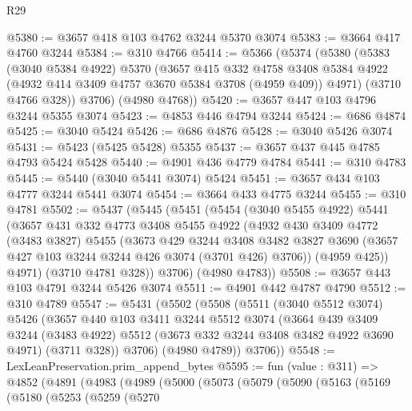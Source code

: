 \begin{lexlean}{R29}
\begin{coremodule}
@5380 := @3657 @418 @103 @4762 @3244 @5370 @3074
@5383 := @3664 @417 @4760 @3244
@5384 := @310 @4766
@5414 := @5366
    (@5374
      (@5380
        (@5383
          (@3040 @5384 @4922)
          @5370
          (@3657
            @415
            @332
            @4758
            @3408
            @5384
            @4922
            (@4932 @414 @3409 @4757 @3670 @5384 @3708 (@4959 @409))
            @4971)
          (@3710 @4766 @328))
        @3706)
      (@4980 @4768))
@5420 := @3657 @447 @103 @4796 @3244 @5355 @3074
@5423 := @4853 @446 @4794 @3244
@5424 := @686 @4874
@5425 := @3040 @5424
@5426 := @686 @4876
@5428 := @3040 @5426 @3074
@5431 := @5423 (@5425 @5428) @5355
@5437 := @3657 @437 @445 @4785 @4793 @5424 @5428
@5440 := @4901 @436 @4779 @4784
@5441 := @310 @4783
@5445 := @5440 (@3040 @5441 @3074) @5424
@5451 := @3657 @434 @103 @4777 @3244 @5441 @3074
@5454 := @3664 @433 @4775 @3244
@5455 := @310 @4781
@5502 := @5437
    (@5445
      (@5451
        (@5454
          (@3040 @5455 @4922)
          @5441
          (@3657
            @431
            @332
            @4773
            @3408
            @5455
            @4922
            (@4932
              @430
              @3409
              @4772
              (@3483 @3827)
              @5455
              (@3673
                @429
                @3244
                @3408
                @3482
                @3827
                @3690
                (@3657 @427 @103 @3244 @3244 @426 @3074 (@3701 @426) @3706))
              (@4959 @425))
            @4971)
          (@3710 @4781 @328))
        @3706)
      (@4980 @4783))
@5508 := @3657 @443 @103 @4791 @3244 @5426 @3074
@5511 := @4901 @442 @4787 @4790
@5512 := @310 @4789
@5547 := @5431
    (@5502
      (@5508
        (@5511
          (@3040 @5512 @3074)
          @5426
          (@3657
            @440
            @103
            @3411
            @3244
            @5512
            @3074
            (@3664
              @439
              @3409
              @3244
              (@3483 @4922)
              @5512
              (@3673 @332 @3244 @3408 @3482 @4922 @3690 @4971)
              (@3711 @328))
            @3706)
          (@4980 @4789))
        @3706))
@5548 := LexLeanPreservation.prim_append_bytes
@5595 := fun (value : @311) =>
  @4852
    (@4891
      (@4983
        (@4989
          (@5000
            (@5073
              (@5079
                (@5090
                  (@5163
                    (@5169
                      (@5180
                        (@5253
                          (@5259
                            (@5270

\end{coremodule}
\end{lexlean}
